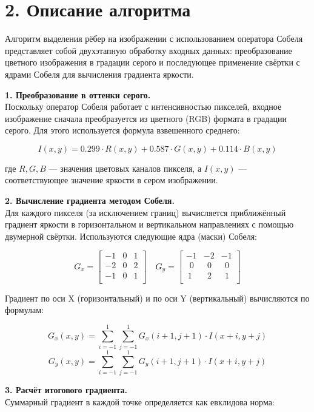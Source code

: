 \documentclass{report}
\begin{document}
\newpage
\section*{2. Описание алгоритма}

\justifying
Алгоритм выделения рёбер на изображении с использованием оператора Собеля представляет собой двухэтапную обработку входных данных: преобразование цветного изображения в градации серого и последующее применение свёртки с ядрами Собеля для вычисления градиента яркости.

\textbf{1. Преобразование в оттенки серого.} \\
Поскольку оператор Собеля работает с интенсивностью пикселей, входное изображение сначала преобразуется из цветного (RGB) формата в градации серого. Для этого используется формула взвешенного среднего:

\[
I(x, y) = 0.299 \cdot R(x, y) + 0.587 \cdot G(x, y) + 0.114 \cdot B(x, y)
\]

где \( R, G, B \) — значения цветовых каналов пикселя, а \( I(x, y) \) — соответствующее значение яркости в сером изображении.

\textbf{2. Вычисление градиента методом Собеля.} \\
Для каждого пикселя (за исключением границ) вычисляется приближённый градиент яркости в горизонтальном и вертикальном направлениях с помощью двумерной свёртки. Используются следующие ядра (маски) Собеля:

\[
G_x =
\begin{bmatrix}
-1 & 0 & 1 \\
-2 & 0 & 2 \\
-1 & 0 & 1 \\
\end{bmatrix}
\quad
G_y =
\begin{bmatrix}
-1 & -2 & -1 \\
\ \ 0 & \ \ 0 & \ \ 0 \\
\ 1 &\ \ 2 &\ \ 1 \\
\end{bmatrix}
\]

Градиент по оси X (горизонтальный) и по оси Y (вертикальный) вычисляются по формулам:

\[
G_x(x, y) = \sum_{i=-1}^{1} \sum_{j=-1}^{1} G_x(i+1, j+1) \cdot I(x+i, y+j)
\]
\[
G_y(x, y) = \sum_{i=-1}^{1} \sum_{j=-1}^{1} G_y(i+1, j+1) \cdot I(x+i, y+j)
\]

\textbf{3. Расчёт итогового градиента.} \\
Суммарный градиент в каждой точке определяется как евклидова норма:
\end{document}
